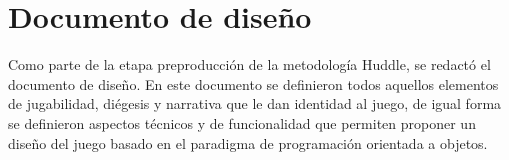 \section{Documento de diseño}
Como parte de la etapa preproducción de la metodología Huddle, se redactó el documento de diseño. En este documento se definieron todos aquellos elementos de jugabilidad, diégesis y narrativa que le dan identidad al juego, de igual forma se definieron aspectos técnicos y de funcionalidad que permiten proponer un diseño del juego basado en el paradigma de programación orientada a objetos.




 
